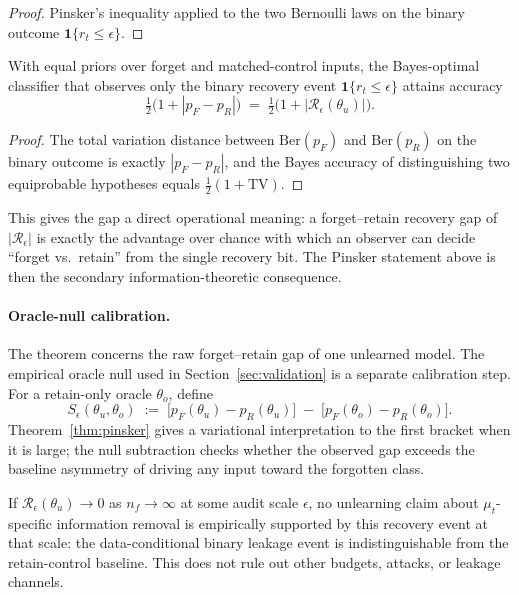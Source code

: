 \begin{proof}
Pinsker's inequality applied to the two Bernoulli laws on the binary outcome
$\mathbf{1}\{r_t \leq \epsilon\}$.
\end{proof}

\begin{corollary}
\label{cor:bayes-acc}
With equal priors over forget and matched-control inputs, the Bayes-optimal
classifier that observes only the binary recovery event
$\mathbf{1}\{r_t \leq \epsilon\}$ attains accuracy
\begin{equation}
  \tfrac{1}{2}\bigl(1 + |p_F - p_R|\bigr)
  \;=\;
  \tfrac{1}{2}\bigl(1 + |\mathcal{R}_\epsilon(\theta_u)|\bigr).
\end{equation}
\end{corollary}

\begin{proof}
The total variation distance between $\mathrm{Ber}(p_F)$ and
$\mathrm{Ber}(p_R)$ on the binary outcome is exactly $|p_F - p_R|$, and the
Bayes accuracy of distinguishing two equiprobable hypotheses equals
$\tfrac{1}{2}(1 + \mathrm{TV})$.
\end{proof}

\noindent This gives the gap a direct operational meaning: a forget--retain
recovery gap of $|\mathcal{R}_\epsilon|$ is exactly the advantage over chance
with which an observer can decide ``forget vs.\ retain'' from the single
recovery bit. The Pinsker statement above is then the secondary
information-theoretic consequence.

\paragraph{Oracle-null calibration.} The theorem concerns the raw
forget--retain gap of one unlearned model. The empirical oracle null used in
Section~\ref{sec:validation} is a separate calibration step. For a retain-only
oracle $\theta_o$, define
\[
S_\epsilon(\theta_u,\theta_o)
\;:=\;
\bigl[p_F(\theta_u)-p_R(\theta_u)\bigr]
\;-\;
\bigl[p_F(\theta_o)-p_R(\theta_o)\bigr].
\]
Theorem~\ref{thm:pinsker} gives a variational interpretation to the first
bracket when it is large; the null subtraction checks whether the observed gap
exceeds the baseline asymmetry of driving any input toward the forgotten class.

\begin{corollary}
\label{cor:scrub}
If $\mathcal{R}_\epsilon(\theta_u) \to 0$ as $n_f \to \infty$ at some
audit scale $\epsilon$, no unlearning claim about $\mu_t$-specific
information removal is empirically supported by this recovery event at that
scale: the data-conditional binary leakage event is indistinguishable from the
retain-control baseline. This does not rule out other budgets, attacks, or
leakage channels.
\end{corollary}

